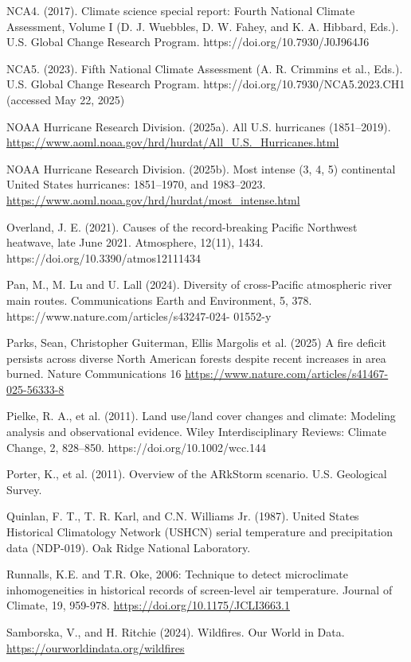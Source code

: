 \documentclass[12pt,paper=a4,DIV=12,parskip=never,chapterprefix=false,headings=standardclasses]{scrreprt}
\begin{document}
NCA4. (2017). Climate science special report: Fourth National Climate Assessment, Volume I (D. J.
Wuebbles, D. W. Fahey, and K. A. Hibbard, Eds.). U.S. Global Change Research Program.
https://doi.org/10.7930/J0J964J6

NCA5. (2023). Fifth National Climate Assessment (A. R. Crimmins et al., Eds.). U.S. Global Change
Research Program. https://doi.org/10.7930/NCA5.2023.CH1 (accessed May 22, 2025)

NOAA Hurricane Research Division. (2025a). All U.S. hurricanes (1851–2019).
\url{https://www.aoml.noaa.gov/hrd/hurdat/All_U.S._Hurricanes.html}

NOAA Hurricane Research Division. (2025b). Most intense (3, 4, 5) continental United States
hurricanes: 1851–1970, and 1983–2023. \url{https://www.aoml.noaa.gov/hrd/hurdat/most_intense.html}

Overland, J. E. (2021). Causes of the record-breaking Pacific Northwest heatwave, late June 2021.
Atmosphere, 12(11), 1434. https://doi.org/10.3390/atmos12111434

Pan, M., M. Lu and U. Lall (2024). Diversity of cross-Pacific atmospheric river main routes.
Communications Earth and Environment, 5, 378. https://www.nature.com/articles/s43247-024-
01552-y

Parks, Sean, Christopher Guiterman, Ellis Margolis et al. (2025) A fire deficit persists across diverse
North American forests despite recent increases in area burned. Nature Communications 16
\url{https://www.nature.com/articles/s41467-025-56333-8}

Pielke, R. A., et al. (2011). Land use/land cover changes and climate: Modeling analysis and
observational evidence. Wiley Interdisciplinary Reviews: Climate Change, 2, 828–850.
https://doi.org/10.1002/wcc.144

Porter, K., et al. (2011). Overview of the ARkStorm scenario. U.S. Geological Survey.

Quinlan, F. T., T. R. Karl, and C.N. Williams Jr. (1987). United States Historical Climatology Network
(USHCN) serial temperature and precipitation data (NDP-019). Oak Ridge National Laboratory.

Runnalls, K.E. and T.R. Oke, 2006: Technique to detect microclimate inhomogeneities in historical
records of screen-level air temperature. Journal of Climate, 19, 959-978.
\url{https://doi.org/10.1175/JCLI3663.1}

Samborska, V., and H. Ritchie (2024). Wildfires. Our World in Data. \url{https://ourworldindata.org/wildfires}
\end{document}

